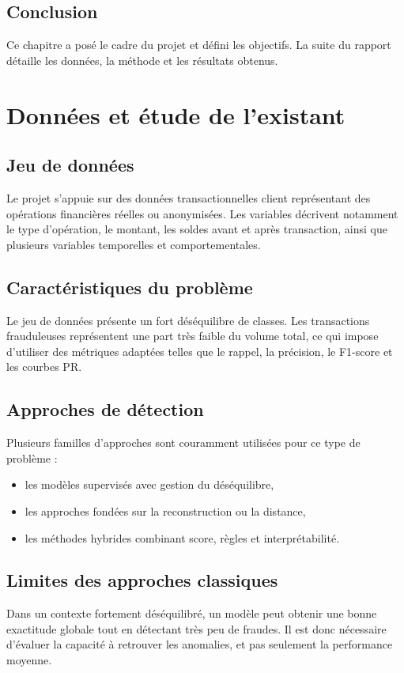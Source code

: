 \documentclass[12pt,a4paper,twoside]{report}
\begin{document}
\section{Conclusion}
Ce chapitre a posé le cadre du projet et défini les objectifs. La suite du rapport détaille les données, la méthode et les résultats obtenus.

\chapter{Données et étude de l'existant}

\section{Jeu de données}
Le projet s'appuie sur des données transactionnelles client représentant des opérations financières réelles ou anonymisées. Les variables décrivent notamment le type d'opération, le montant, les soldes avant et après transaction, ainsi que plusieurs variables temporelles et comportementales.

\section{Caractéristiques du problème}
Le jeu de données présente un fort déséquilibre de classes. Les transactions frauduleuses représentent une part très faible du volume total, ce qui impose d'utiliser des métriques adaptées telles que le rappel, la précision, le F1-score et les courbes PR.

\section{Approches de détection}
Plusieurs familles d'approches sont couramment utilisées pour ce type de problème :
\begin{itemize}
  \item les modèles supervisés avec gestion du déséquilibre,
  \item les approches fondées sur la reconstruction ou la distance,
  \item les méthodes hybrides combinant score, règles et interprétabilité.
\end{itemize}

\section{Limites des approches classiques}
Dans un contexte fortement déséquilibré, un modèle peut obtenir une bonne exactitude globale tout en détectant très peu de fraudes. Il est donc nécessaire d'évaluer la capacité à retrouver les anomalies, et pas seulement la performance moyenne.
\end{document}

